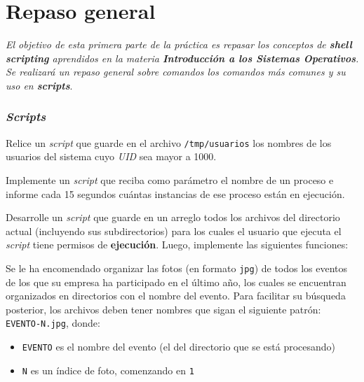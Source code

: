 \section{Repaso general}

\textit{El objetivo de esta primera parte de la práctica es repasar los
  conceptos de \textbf{shell scripting} aprendidos en la materia
  \textbf{Introducción a los Sistemas Operativos}. Se realizará un repaso
  general sobre comandos los comandos más comunes y su uso en
  \textbf{scripts}}.

\subsubsection{\textit{Scripts}}

\begin{questions}
\question Relice un \textit{script} que guarde en el archivo \texttt{/tmp/usuarios} los
  nombres de los usuarios del sistema cuyo \textit{UID} sea mayor a 1000.

\question Implemente un \textit{script} que reciba como parámetro el nombre de un
  proceso e informe cada 15 segundos cuántas instancias de ese proceso están en
  ejecución.

\question Desarrolle un \textit{script} que guarde en un arreglo todos los archivos del
  directorio actual (incluyendo sus subdirectorios) para los cuales el usuario que ejecuta
  el \textit{script} tiene permisos de \textbf{ejecución}. Luego, implemente las siguientes
  funciones:

\question Se le ha encomendado organizar las fotos (en formato \texttt{jpg}) de todos los eventos
  de los que su empresa ha participado en el último año, los cuales se encuentran organizados en
  directorios con el nombre del evento. Para facilitar su búsqueda posterior, los archivos deben
  tener nombres que sigan el siguiente patrón: \texttt{EVENTO-N.jpg}, donde:
  \begin{itemize}
    \item \texttt{EVENTO} es el nombre del evento (el del directorio que se está procesando)
    \item \texttt{N} es un índice de foto, comenzando en \texttt{1}
  \end{itemize}


\end{questions}
